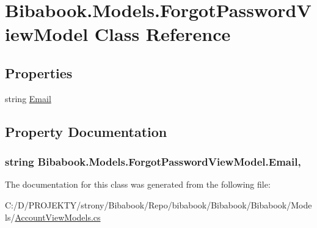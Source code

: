 \hypertarget{class_bibabook_1_1_models_1_1_forgot_password_view_model}{}\section{Bibabook.\+Models.\+Forgot\+Password\+View\+Model Class Reference}
\label{class_bibabook_1_1_models_1_1_forgot_password_view_model}
\subsection*{Properties}
\begin{DoxyCompactItemize}
\item 
string \hyperlink{class_bibabook_1_1_models_1_1_forgot_password_view_model_a573acaca080fd8e1a0e14dce4dbde1d0}{Email}
\end{DoxyCompactItemize}


\subsection{Property Documentation}
\hypertarget{class_bibabook_1_1_models_1_1_forgot_password_view_model_a573acaca080fd8e1a0e14dce4dbde1d0}{}
\subsubsection[{Email}]{\setlength{\rightskip}{0pt plus 5cm}string Bibabook.\+Models.\+Forgot\+Password\+View\+Model.\+Email\hspace{0.3cm}{\ttfamily [get]}, {\ttfamily [set]}}\label{class_bibabook_1_1_models_1_1_forgot_password_view_model_a573acaca080fd8e1a0e14dce4dbde1d0}


The documentation for this class was generated from the following file\+:\begin{DoxyCompactItemize}
\item 
C\+:/\+D/\+P\+R\+O\+J\+E\+K\+T\+Y/strony/\+Bibabook/\+Repo/bibabook/\+Bibabook/\+Bibabook/\+Models/\hyperlink{_account_view_models_8cs}{Account\+View\+Models.\+cs}\end{DoxyCompactItemize}
